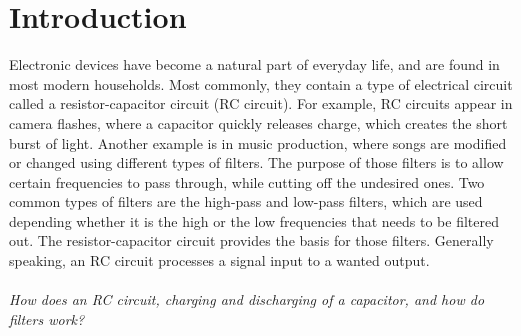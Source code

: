 \chapter{Introduction}
Electronic devices have become a natural part of everyday life, and are found in most modern households. Most commonly, they contain a type of electrical circuit called a resistor-capacitor circuit (RC circuit). For example, RC circuits appear in camera flashes, where a capacitor quickly releases charge, which creates the short burst of light. Another example is in music production, where songs are modified or changed using different types of filters. The purpose of those filters is to allow certain frequencies to pass through, while cutting off the undesired ones. Two common types of filters are the high-pass and low-pass filters, which are used depending whether it is the high or the low frequencies that needs to be filtered out. The resistor-capacitor circuit provides the basis for those filters. Generally speaking, an RC circuit processes a signal input to a wanted output. 
\\ \\
\textit{How does an RC circuit, charging and discharging of a capacitor, and how do filters work?}

